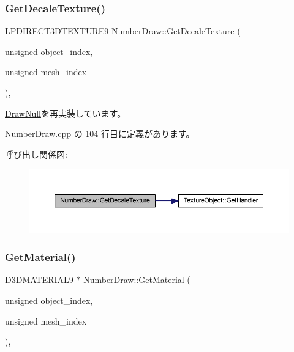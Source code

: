 \subsubsection{\texorpdfstring{Get\+Decale\+Texture()}{GetDecaleTexture()}}
{\footnotesize\ttfamily L\+P\+D\+I\+R\+E\+C\+T3\+D\+T\+E\+X\+T\+U\+R\+E9 Number\+Draw\+::\+Get\+Decale\+Texture (\begin{DoxyParamCaption}\item[{unsigned}]{object\+\_\+index,  }\item[{unsigned}]{mesh\+\_\+index }\end{DoxyParamCaption})\hspace{0.3cm}{\ttfamily [override]}, {\ttfamily [virtual]}}



\mbox{\hyperlink{class_draw_null_a8496ed1b1f765a331a8f1704122b8ca4}{Draw\+Null}}を再実装しています。



 Number\+Draw.\+cpp の 104 行目に定義があります。

呼び出し関係図\+:\nopagebreak
\begin{figure}[H]
\begin{center}
\leavevmode
\includegraphics[width=350pt]{class_number_draw_ad1d9a4cee49e7bddce51b5c58e739de9_cgraph}
\end{center}
\end{figure}
\mbox{\label{class_number_draw_a3348d9d1cdd9dd03be25b82069275ca5}} 
\subsubsection{\texorpdfstring{Get\+Material()}{GetMaterial()}}
{\footnotesize\ttfamily D3\+D\+M\+A\+T\+E\+R\+I\+A\+L9 $\ast$ Number\+Draw\+::\+Get\+Material (\begin{DoxyParamCaption}\item[{unsigned}]{object\+\_\+index,  }\item[{unsigned}]{mesh\+\_\+index }\end{DoxyParamCaption})\hspace{0.3cm}{\ttfamily [override]}, {\ttfamily [virtual]}}



